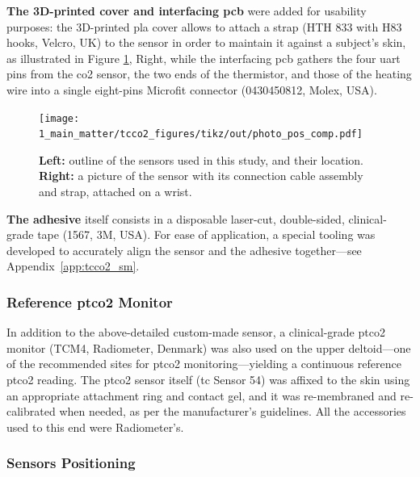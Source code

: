 \textbf{The 3D-printed cover and interfacing \gls{pcb}} were added for usability purposes: the 3D-printed \gls{pla} cover allows to attach a strap (HTH 833 with H83 hooks, Velcro, UK) to the sensor in order to maintain it against a subject's skin, as illustrated in Figure \ref{fig:tcco2:photo_pos}, Right, while the interfacing \gls{pcb} gathers the four \gls{uart} pins from the \gls{co2} sensor, the two ends of the thermistor, and those of the heating wire into a single eight-pins Microfit connector (0430450812, Molex, USA).

\begin{figure}
	\centering
	\texttt{[image: 1\_main\_matter/tcco2\_figures/tikz/out/photo\_pos\_comp.pdf]}
	\caption[Location and photo of the sensor.]{\textbf{Left:} outline of the sensors used in this study, and their location. \textbf{Right:} a picture of the sensor with its connection cable assembly and strap, attached on a wrist.}\label{fig:tcco2:photo_pos}
\end{figure}

\textbf{The adhesive} itself consists in a disposable laser-cut, double-sided, clinical-grade tape (1567, 3M, USA). For ease of application, a special tooling was developed to accurately align the sensor and the adhesive together---see Appendix~\ref{app:tcco2_sm}.

\subsubsection{Reference \texorpdfstring{\gls{ptco2}}{tcpCO2} Monitor}

In addition to the above-detailed custom-made sensor, a clinical-grade \gls{ptco2} monitor (TCM4, Radiometer, Denmark) was also used on the upper deltoid---one of the recommended sites for \gls{ptco2} monitoring\cite{vsign_brochure}---yielding a continuous reference \gls{ptco2} reading. The \gls{ptco2} sensor itself (tc Sensor 54) was affixed to the skin using an appropriate attachment ring and contact gel, and it was re-membraned and re-calibrated when needed, as per the manufacturer's guidelines. All the accessories used to this end were Radiometer's\cite{radiometer_combim}.

\subsubsection{Sensors Positioning}

